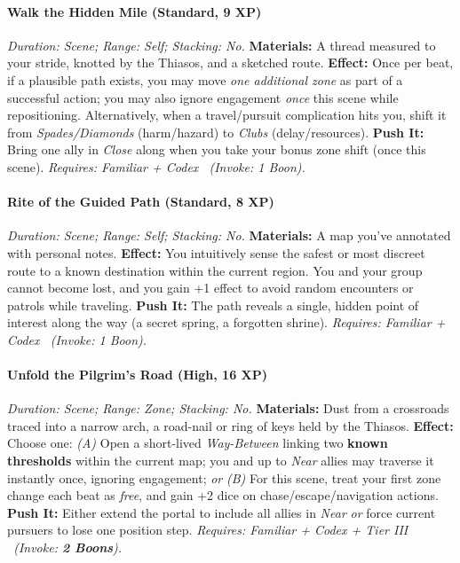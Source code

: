\documentclass[12pt,twoside]{book}
\begin{document}
\paragraph{Walk the Hidden Mile (Standard, 9 XP)} \emph{Duration: Scene; Range: Self; Stacking: No.}
\textbf{Materials:} A thread measured to your stride, knotted by the Thiasos, and a sketched route.
\textbf{Effect:} Once per beat, if a plausible path exists, you may move \emph{one additional zone} as part of a successful action; you may also ignore engagement \emph{once} this scene while repositioning. Alternatively, when a travel/pursuit complication hits you, shift it from \emph{Spades/Diamonds} (harm/hazard) to \emph{Clubs} (delay/resources).
\textbf{Push It:} Bring one ally in \emph{Close} along when you take your bonus zone shift (once this scene).
\emph{Requires: Familiar + Codex \ (\textit{Invoke:} 1 Boon).}
\paragraph{Rite of the Guided Path (Standard, 8 XP)} \emph{Duration: Scene; Range: Self; Stacking: No.}
\textbf{Materials:} A map you've annotated with personal notes.
\textbf{Effect:} You intuitively sense the safest or most discreet route to a known destination within the current region. You and your group cannot become lost, and you gain +1 effect to avoid random encounters or patrols while traveling.
\textbf{Push It:} The path reveals a single, hidden point of interest along the way (a secret spring, a forgotten shrine).
\emph{Requires: Familiar + Codex \ (\textit{Invoke:} 1 Boon).}
\paragraph{Unfold the Pilgrim's Road (High, 16 XP)} \emph{Duration: Scene; Range: Zone; Stacking: No.}
\textbf{Materials:} Dust from a crossroads traced into a narrow arch, a road-nail or ring of keys held by the Thiasos.
\textbf{Effect:} Choose one:
\emph{(A)} Open a short-lived \emph{Way-Between} linking two \textbf{known thresholds} within the current map; you and up to \emph{Near} allies may traverse it instantly once, ignoring engagement; \emph{or}
\emph{(B)} For this scene, treat your first zone change each beat as \emph{free}, and gain +2 dice on chase/escape/navigation actions.
\textbf{Push It:} Either extend the portal to include all allies in \emph{Near} \emph{or} force current pursuers to lose one position step.
\emph{Requires: Familiar + Codex + Tier III \ (\textit{Invoke:} \textbf{2 Boons}).}
\end{document}
